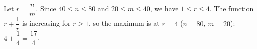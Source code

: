 Let $r=\dfrac nm$. Since $40\le n\le80$ and $20\le m\le40$, we have $1\le r\le4$. The function $r+\dfrac1r$ is increasing for $r\ge1$, so the maximum is at $r=4$ ($n=80$, $m=20$): $4+\dfrac14=\boxed{\dfrac{17}4}$.

